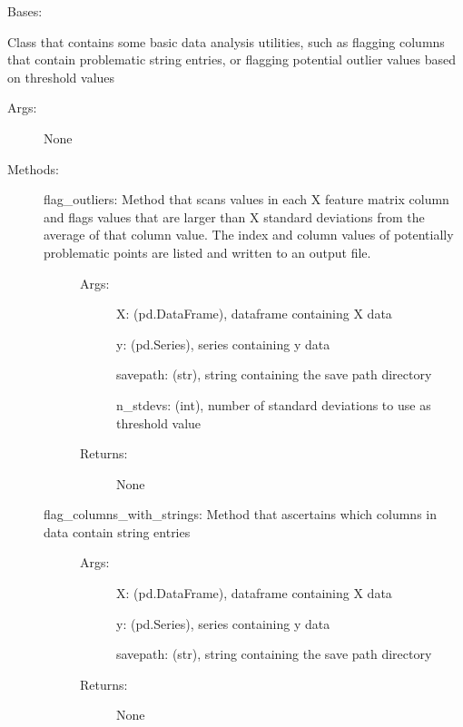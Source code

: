 \documentclass[letterpaper,10pt,english]{sphinxmanual}
\begin{document}
\begin{fulllineitems}
\label{\detokenize{api/mastml.data_cleaning.DataUtilities:mastml.data_cleaning.DataUtilities}}
Bases: 

Class that contains some basic data analysis utilities, such as flagging columns that contain problematic string
entries, or flagging potential outlier values based on threshold values
\begin{description}
\item[{Args:}] \leavevmode
None

\item[{Methods:}] \leavevmode\begin{description}
\item[{flag\_outliers: Method that scans values in each X feature matrix column and flags values that are larger than X standard deviations from the average of that column value. The index and column values of potentially problematic points are listed and written to an output file.}] \leavevmode\begin{description}
\item[{Args:}] \leavevmode
X: (pd.DataFrame), dataframe containing X data

y: (pd.Series), series containing y data

savepath: (str), string containing the save path directory

n\_stdevs: (int), number of standard deviations to use as threshold value

\item[{Returns:}] \leavevmode
None

\end{description}

\item[{flag\_columns\_with\_strings: Method that ascertains which columns in data contain string entries}] \leavevmode\begin{description}
\item[{Args:}] \leavevmode
X: (pd.DataFrame), dataframe containing X data

y: (pd.Series), series containing y data

savepath: (str), string containing the save path directory

\item[{Returns:}] \leavevmode
None


\end{description}
\end{description}
\end{description}
\end{fulllineitems}
\end{document}
